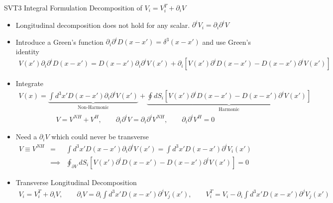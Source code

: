\documentclass[8pt,aspectratio=1610]{beamer}
\begin{document}

\begin{frame}{SVT3 Integral Formulation}
	Decomposition of $V_i = V_i^T + \partial_i V$
	\begin{itemize}
		\item Longitudinal decomposition does not hold for any scalar. $\partial^i V_i = \partial_i\partial^i V$
		\item Introduce a Green's function $\partial_i \partial^i D(x-x') = \delta^3(x-x')$ and use Green's identity
		\begin{eqnarray}
		V(x')\partial_i \partial^i D(x-x') = D(x-x')\partial_i \partial^i V(x') + \partial_i[V(x')\partial^i D(x-x') - D(x-x')\partial^i V(x')]
		\end{eqnarray}
		\item Integrate
		\begin{eqnarray}
		V(x) = \underbrace{\int d^3x' D(x-x')\partial_i \partial^i V(x')}_{\text{Non-Harmonic}} + \underbrace{\oint dS_i[V(x')\partial^i D(x-x') - D(x-x')\partial^i V(x')]}_{\text{Harmonic}}
		\end{eqnarray}
		\begin{eqnarray}
		V = V^{NH} + V^{H},\qquad \partial_i\partial^i V = \partial_i\partial^i V^{NH},\qquad \partial_i\partial^i V^{H} = 0
		\end{eqnarray}
		\item Need a $\partial_i V$ which could never be transverse
		\begin{eqnarray}
		V \equiv V^{NH} &=& \int d^3x' D(x-x')\partial_i \partial^i V(x') = \int d^3x' D(x-x') \partial^i V_i(x')
		\nonumber\\
		&\implies& \oint_{\partial V} dS_i[V(x')\partial^i D(x-x') - D(x-x')\partial^i V(x')] = 0
		\end{eqnarray}
		\item Transverse Longitudinal Decomposition
		\begin{eqnarray}
		V_i = V_i^T + \partial_i V, \qquad \partial_i V = \partial_i \int d^3x' D(x-x')\partial^j V_j (x'),\qquad  V_i^T = V_i - \partial_i \int d^3x' D(x-x')\partial^j V_j (x')
		\end{eqnarray}
		
	\end{itemize}
\end{frame}

\end{document}

